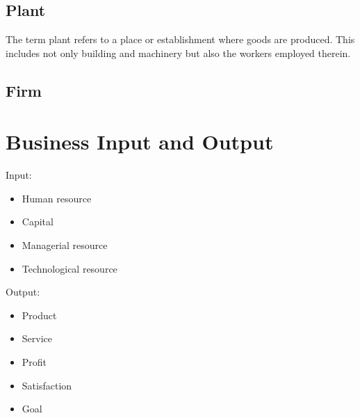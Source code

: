 \documentclass[11pt]{book}
\begin{document}
\subsection{Plant}
The term plant refers to a place or establishment where goods are produced. This includes not only building and machinery but also the workers employed therein.
\subsection{Firm}


\section{Business Input and Output}
Input:
\begin{itemize}
	\item Human resource
	\item Capital
	\item Managerial resource
	\item Technological resource
\end{itemize}
Output:
\begin{itemize}
	\item Product
	\item Service
	\item Profit
	\item Satisfaction
	\item Goal
\end{itemize}
\end{document}
